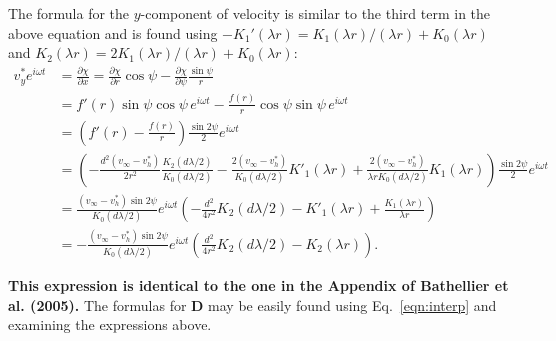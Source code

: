 \documentclass[11pt]{amsart}
\newcommand{\vinf}{v_{\infty}}
\newcommand{\om}{\omega}
\newcommand{\bD}{\mathbf{D}}
\newcommand{\pd}[2]{\ensuremath{\frac{\partial #1}{\partial #2}}}
\begin{document}
The formula for the $y$-component of velocity is similar to the third term in the above equation and is found using $-K_1'(\lambda r) = K_1(\lambda r)/(\lambda r) + K_0(\lambda r)$ and $K_2(\lambda r) = 2K_1(\lambda r)/(\lambda r) + K_0(\lambda r)$:
\begin{align}
v_y^* e^{i \om t} &= \pd{\chi}{x} = \pd{\chi}{r}\cos\psi - \pd{\chi}{\psi}\frac{\sin\psi}{r} \nonumber\\
&= f'(r)\sin\psi\cos\psi\,e^{i\om t} - \frac{f(r)}{r}\cos\psi\sin\psi\,e^{i\om t} \nonumber\\
&= \left( f'(r) - \frac{f(r)}{r} \right)\frac{\sin2\psi}{2}e^{i\om t} \nonumber\\ 
&= \left( -\frac{d^2(\vinf-v_h^*)}{2r^2}\frac{K_2(d\lambda/2)}{K_0(d\lambda/2)} - \frac{2(\vinf-v_h^*)}{K_0(d\lambda/2)}K'_1(\lambda r) + \frac{2(\vinf-v_h^*)}{\lambda r K_0(d\lambda/2)}K_1(\lambda r) \right)\frac{\sin2\psi}{2}e^{i\om t} \nonumber\\
&= \frac{(\vinf-v_h^*)\sin2\psi}{K_0(d\lambda/2)}e^{i\om t}\left( -\frac{d^2}{4r^2}K_2(d\lambda/2) - K'_1(\lambda r) + \frac{K_1(\lambda r)}{\lambda r } \right) \nonumber\\
&= -\frac{(\vinf-v_h^*)\sin2\psi}{K_0(d\lambda/2)}e^{i\om t}\left( \frac{d^2}{4r^2}K_2(d\lambda/2) - K_2(\lambda r)\right). \label{eqn:vy}
\end{align}

\textbf{This expression is identical to the one in the Appendix of Bathellier et al. (2005).} The formulas for $\bD$ may be easily found using Eq.~\eqref{eqn:interp} and examining the expressions above.
\end{document}
